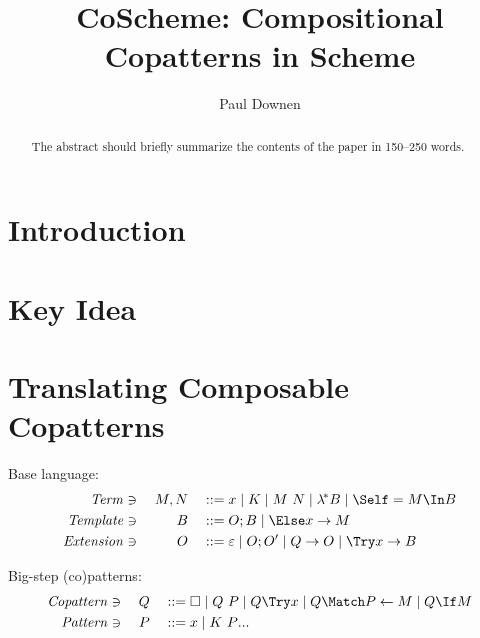 \documentclass[runningheads]{llncs}
\begin{document}
%
\title{CoScheme: Compositional Copatterns in Scheme}
%
%
\author{Paul Downen}
%
%
%
\maketitle              %
%
\begin{abstract}
The abstract should briefly summarize the contents of the paper in
150--250 words.

\end{abstract}
%
%
%
\section{Introduction}

\section{Key Idea}

\section{Translating Composable Copatterns}

Base language:
\begin{alignat*}{3}
  \mathit{Term} &\ni{}& M, N &&
  &::= x
  \mid K
  \mid M ~ N
  \mid \lamstar B
  \mid \Self = M \In B
  \\
  \mathit{Template} &\ni{}& B &&
  &::= O; B
  \mid \Else x \to M
  \\
  \mathit{Extension} &\ni{}& O &&
  &::= \varepsilon
  \mid O; O'
  \mid Q \to O
  \mid \Try x \to B
\end{alignat*}

Big-step (co)patterns:
\begin{align*}
  \mathit{Copattern} &\ni{}& Q &&
  &::= \hole
  \mid Q ~ P
  \mid Q \Try x
  \mid Q \Match P \gets M
  \mid Q \If M
  \\
  \mathit{Pattern} &\ni{}& P &&
  &::= x
  \mid K ~ \many{P}
\end{align*}
\end{document}
